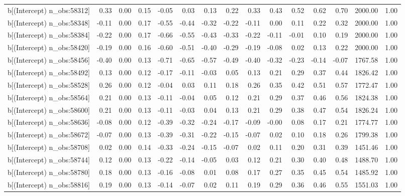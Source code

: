 \begin{table}[ht]
\begin{tabular}{rrrrrrrrrrrrrrr}
  b[(Intercept) n\_obs:58312] & 0.33 & 0.00 & 0.15 & -0.05 & 0.03 & 0.13 & 0.22 & 0.33 & 0.43 & 0.52 & 0.62 & 0.70 & 2000.00 & 1.00 \\ 
  b[(Intercept) n\_obs:58348] & -0.11 & 0.00 & 0.17 & -0.55 & -0.44 & -0.32 & -0.22 & -0.11 & 0.00 & 0.11 & 0.22 & 0.32 & 2000.00 & 1.00 \\ 
  b[(Intercept) n\_obs:58384] & -0.22 & 0.00 & 0.17 & -0.66 & -0.55 & -0.43 & -0.33 & -0.22 & -0.11 & -0.01 & 0.10 & 0.19 & 2000.00 & 1.00 \\ 
  b[(Intercept) n\_obs:58420] & -0.19 & 0.00 & 0.16 & -0.60 & -0.51 & -0.40 & -0.29 & -0.19 & -0.08 & 0.02 & 0.13 & 0.22 & 2000.00 & 1.00 \\ 
  b[(Intercept) n\_obs:58456] & -0.40 & 0.00 & 0.13 & -0.71 & -0.65 & -0.57 & -0.49 & -0.40 & -0.32 & -0.23 & -0.14 & -0.07 & 1767.58 & 1.00 \\ 
  b[(Intercept) n\_obs:58492] & 0.13 & 0.00 & 0.12 & -0.17 & -0.11 & -0.03 & 0.05 & 0.13 & 0.21 & 0.29 & 0.37 & 0.44 & 1826.42 & 1.00 \\ 
  b[(Intercept) n\_obs:58528] & 0.26 & 0.00 & 0.12 & -0.04 & 0.03 & 0.11 & 0.18 & 0.26 & 0.35 & 0.42 & 0.51 & 0.57 & 1772.47 & 1.00 \\ 
  b[(Intercept) n\_obs:58564] & 0.21 & 0.00 & 0.13 & -0.11 & -0.04 & 0.05 & 0.12 & 0.21 & 0.29 & 0.37 & 0.46 & 0.56 & 1824.38 & 1.00 \\ 
  b[(Intercept) n\_obs:58600] & 0.21 & 0.00 & 0.13 & -0.11 & -0.03 & 0.04 & 0.13 & 0.21 & 0.29 & 0.38 & 0.47 & 0.54 & 1826.24 & 1.00 \\ 
  b[(Intercept) n\_obs:58636] & -0.08 & 0.00 & 0.12 & -0.39 & -0.32 & -0.24 & -0.17 & -0.09 & -0.00 & 0.08 & 0.17 & 0.21 & 1774.77 & 1.00 \\ 
  b[(Intercept) n\_obs:58672] & -0.07 & 0.00 & 0.13 & -0.39 & -0.31 & -0.22 & -0.15 & -0.07 & 0.02 & 0.10 & 0.18 & 0.26 & 1799.38 & 1.00 \\ 
  b[(Intercept) n\_obs:58708] & 0.02 & 0.00 & 0.14 & -0.33 & -0.24 & -0.15 & -0.07 & 0.02 & 0.11 & 0.20 & 0.31 & 0.39 & 1451.46 & 1.00 \\ 
  b[(Intercept) n\_obs:58744] & 0.12 & 0.00 & 0.13 & -0.22 & -0.14 & -0.05 & 0.03 & 0.12 & 0.21 & 0.30 & 0.40 & 0.48 & 1488.70 & 1.00 \\ 
  b[(Intercept) n\_obs:58780] & 0.18 & 0.00 & 0.13 & -0.16 & -0.08 & 0.01 & 0.08 & 0.17 & 0.27 & 0.35 & 0.45 & 0.54 & 1485.92 & 1.00 \\ 
  b[(Intercept) n\_obs:58816] & 0.19 & 0.00 & 0.13 & -0.14 & -0.07 & 0.02 & 0.11 & 0.19 & 0.29 & 0.36 & 0.46 & 0.55 & 1551.03 & 1.00 \\ 

\end{tabular}
\end{table}
